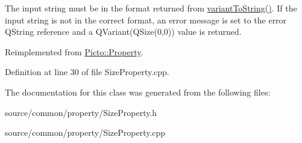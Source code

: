 The input string must be in the format returned from \hyperlink{class_picto_1_1_size_property_a168414cb81e4327050496c4ac8eac5eb}{variant\-To\-String()}. If the input string is not in the correct format, an error message is set to the error Q\-String reference and a Q\-Variant(Q\-Size(0,0)) value is returned. 

Reimplemented from \hyperlink{class_picto_1_1_property_a97d52011d6db190c5c28a21d76ac1d3b}{Picto\-::\-Property}.



Definition at line 30 of file Size\-Property.\-cpp.



The documentation for this class was generated from the following files\-:\begin{DoxyCompactItemize}
\item 
source/common/property/Size\-Property.\-h\item 
source/common/property/Size\-Property.\-cpp\end{DoxyCompactItemize}

